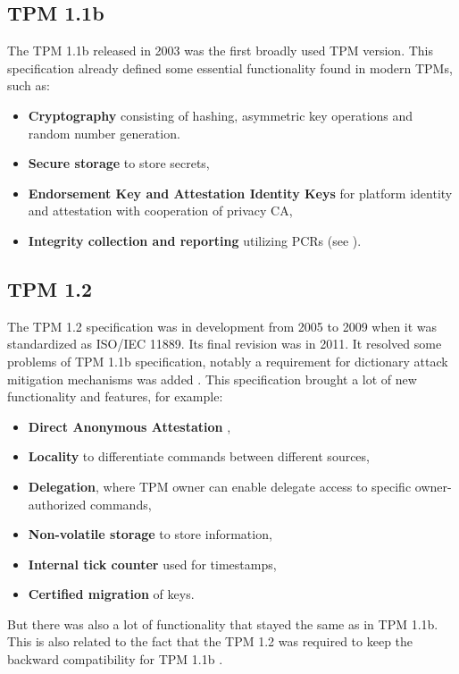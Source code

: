 \subsection{TPM 1.1b}
The TPM 1.1b released in 2003 was the first broadly used TPM version. This specification already defined some essential functionality found in modern TPMs, such as:
\begin{itemize}
    \item \textbf{Cryptography} consisting of hashing, asymmetric key operations and random number generation.
    \item \textbf{Secure storage} to store secrets,
    \item \textbf{Endorsement Key and Attestation Identity Keys} for platform identity and attestation with cooperation of privacy CA,
    \item \textbf{Integrity collection and reporting} utilizing PCRs (see ).
\end{itemize}

\subsection{TPM 1.2}
The TPM 1.2 specification was in development from 2005 to 2009 when it was standardized as ISO/IEC 11889. Its final revision was in 2011. It resolved some problems of TPM 1.1b specification, notably a requirement for dictionary attack mitigation mechanisms was added \cite[p.~36-37]{tcg_1.2_design_princ}. This specification brought a lot of new functionality and features, for example:
\begin{itemize}
    \item \textbf{Direct Anonymous Attestation} \cite{daaSpec, daaDesignAndImple},
    \item \textbf{Locality} to differentiate commands between different sources,
    \item \textbf{Delegation}, where TPM owner can enable delegate access to specific owner-authorized commands,
    \item \textbf{Non-volatile storage} to store information,
    \item \textbf{Internal tick counter} used for timestamps,
    \item \textbf{Certified migration} of keys.
\end{itemize}
But there was also a lot of functionality that stayed the same as in TPM 1.1b. This is also related to the fact that the TPM 1.2 was required to keep the backward compatibility for TPM 1.1b \cite[p.~169]{tcg_1.2_design_princ}.

